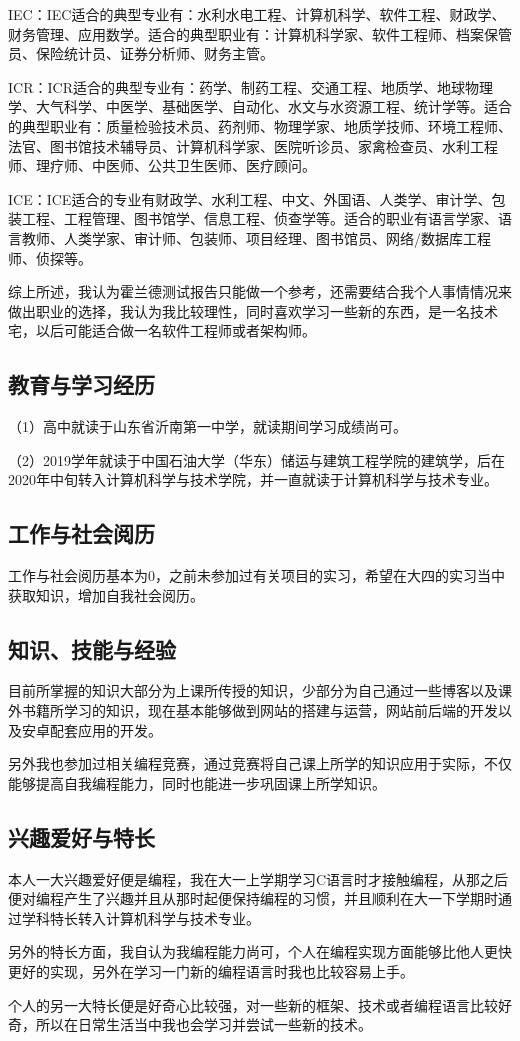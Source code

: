 \documentclass{article}
\begin{document}
\par
IEC：IEC适合的典型专业有：水利水电工程、计算机科学、软件工程、财政学、财务管理、应用数学。适合的典型职业有：计算机科学家、软件工程师、档案保管员、保险统计员、证券分析师、财务主管。
\par
ICR：ICR适合的典型专业有：药学、制药工程、交通工程、地质学、地球物理学、大气科学、中医学、基础医学、自动化、水文与水资源工程、统计学等。适合的典型职业有：质量检验技术员、药剂师、物理学家、地质学技师、环境工程师、法官、图书馆技术辅导员、计算机科学家、医院听诊员、家禽检查员、水利工程师、理疗师、中医师、公共卫生医师、医疗顾问。
\par
ICE：ICE适合的专业有财政学、水利工程、中文、外国语、人类学、审计学、包装工程、工程管理、图书馆学、信息工程、侦查学等。适合的职业有语言学家、语言教师、人类学家、审计师、包装师、项目经理、图书馆员、网络/数据库工程师、侦探等。
\par
综上所述，我认为霍兰德测试报告只能做一个参考，还需要结合我个人事情情况来做出职业的选择，我认为我比较理性，同时喜欢学习一些新的东西，是一名技术宅，以后可能适合做一名软件工程师或者架构师。
\par
\subsection{教育与学习经历}
（1）高中就读于山东省沂南第一中学，就读期间学习成绩尚可。\par
（2）2019学年就读于中国石油大学（华东）储运与建筑工程学院的建筑学，后在2020年中旬转入计算机科学与技术学院，并一直就读于计算机科学与技术专业。
\par
\subsection{工作与社会阅历}
工作与社会阅历基本为0，之前未参加过有关项目的实习，希望在大四的实习当中获取知识，增加自我社会阅历。
\par
\subsection{知识、技能与经验}
目前所掌握的知识大部分为上课所传授的知识，少部分为自己通过一些博客以及课外书籍所学习的知识，现在基本能够做到网站的搭建与运营，网站前后端的开发以及安卓配套应用的开发。
\par
另外我也参加过相关编程竞赛，通过竞赛将自己课上所学的知识应用于实际，不仅能够提高自我编程能力，同时也能进一步巩固课上所学知识。
\par
\subsection{兴趣爱好与特长}
本人一大兴趣爱好便是编程，我在大一上学期学习C语言时才接触编程，从那之后便对编程产生了兴趣并且从那时起便保持编程的习惯，并且顺利在大一下学期时通过学科特长转入计算机科学与技术专业。
\par
另外的特长方面，我自认为我编程能力尚可，个人在编程实现方面能够比他人更快更好的实现，另外在学习一门新的编程语言时我也比较容易上手。
\par
个人的另一大特长便是好奇心比较强，对一些新的框架、技术或者编程语言比较好奇，所以在日常生活当中我也会学习并尝试一些新的技术。
\end{document}
